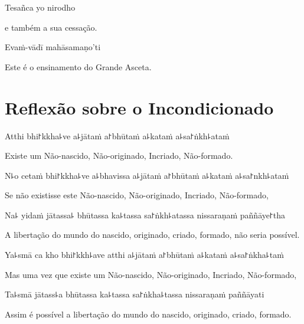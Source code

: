 Tesañca yo nirodho

\begin{english}
  e também a sua cessação.
\end{english}

Evaṁ-vādī mahāsamaṇo'ti

\begin{english}
  Este é o ensinamento do Grande Asceta.
\end{english}


\chapter[Incondicionado]{Reflexão sobre o Incondicionado}


\begin{leader}
\end{leader}

Atthi bhi꜓kkha꜕ve a꜕jātaṁ a꜓bhūtaṁ a꜕kataṁ a꜕sa꜓ṅkh꜕ataṁ

\begin{english}
  Existe um Não-nascido, Não-originado, Incriado, Não-formado.
\end{english}

N꜕o cetaṁ bhi꜓kkha꜕ve a꜕bhavissa a꜕jātaṁ a꜓bhūtaṁ a꜕kataṁ a꜕sa꜓nkh꜕ataṁ

\begin{english}
 Se não existisse este Não-nascido, Não-originado, Incriado, Não-formado,
\end{english}

Na꜕ yidaṁ jātassa꜕ bhūtassa ka꜕tassa sa꜓ṅkh꜕atassa nissaraṇaṁ paññāye꜓tha

\begin{english}
  A libertação do mundo do nascido, originado, criado, formado, não seria possível.
\end{english}

Ya꜕smā ca kho bhi꜓kkh꜕ave atthi a꜕jātaṁ a꜓bhūtaṁ a꜕kataṁ a꜕sa꜓ṅkha꜕taṁ

\begin{english}
  Mas uma vez que existe um Não-nascido, Não-originado, Incriado, Não-formado,
\end{english}

Ta꜕smā jātass꜕a bhūtassa ka꜕tassa sa꜓ṅkha꜕tassa nissaraṇaṁ paññāyati

\begin{english}
  Assim é possível a libertação do mundo do nascido, originado, criado, formado.
\end{english}

